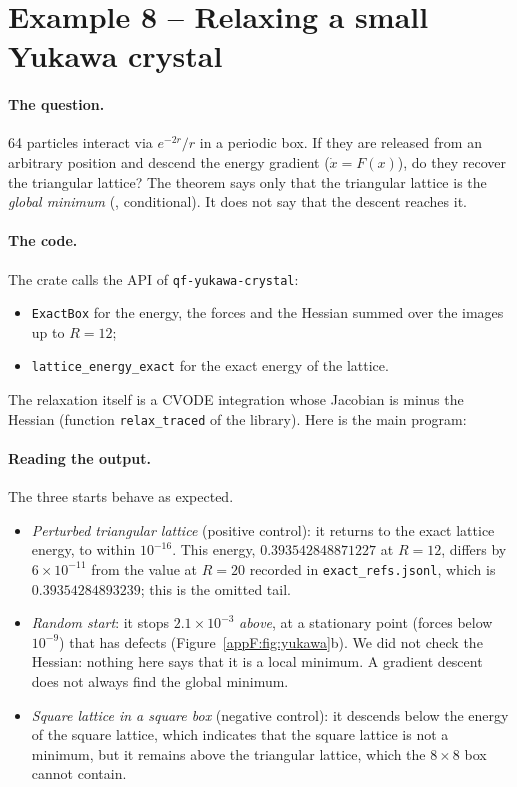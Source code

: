 \section{Example 8 -- Relaxing a small Yukawa crystal}\label{appF:ex8}

\paragraph{The question.} 64 particles interact via $e^{-2r}/r$ in a periodic box. If they are released from an
arbitrary position and descend the energy gradient ($\dot x=F(x)$), do they recover the triangular lattice? The theorem
says only that the triangular lattice is the \emph{global minimum} (\tierA, conditional). It does not say that the
descent reaches it.

\paragraph{The code.} The crate calls the API of \texttt{qf-yukawa-crystal}:
\begin{itemize}
\item \texttt{ExactBox} for the energy, the forces and the Hessian summed over the images up to $R=12$;
\item \texttt{lattice\_energy\_exact} for the exact energy of the lattice.
\end{itemize}
The relaxation itself is a CVODE integration whose Jacobian is minus the Hessian (function \texttt{relax\_traced} of the
library). Here is the main program:


\paragraph{Reading the output.} The three starts behave as expected.
\begin{itemize}
\item \emph{Perturbed triangular lattice} (positive control): it returns to the exact lattice energy, to within
$10^{-16}$. This energy, $0.393542848871227$ at $R=12$, differs by $6\times10^{-11}$ from the value at $R=20$ recorded in
\texttt{exact\_refs.jsonl}, which is $0.39354284893239$; this is the omitted tail.
\item \emph{Random start}: it stops $2.1\times10^{-3}$ \emph{above}, at a stationary point (forces below $10^{-9}$) that
has defects (Figure~\ref{appF:fig:yukawa}b). We did not check the Hessian: nothing here says that it is a local
minimum. A gradient descent does not always find the global minimum.
\item \emph{Square lattice in a square box} (negative control): it descends below the energy of the square lattice,
which indicates that the square lattice is not a minimum, but it remains above the triangular lattice, which the
$8\times8$ box cannot contain.
\end{itemize}

